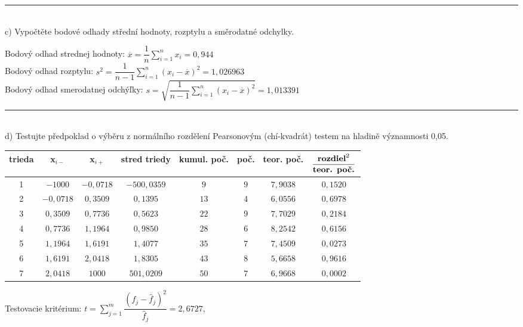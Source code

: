 \documentclass[pdftex, 11pt, a4paper, titlepage]{article}
\begin{document}
    \noindent\rule{\linewidth}{0.4pt}\\

    \noindent
    c) Vypočtěte bodové odhady střední hodnoty, rozptylu a směrodatné odchylky.

    \noindent
    Bodový odhad strednej hodnoty: $ \overline{x} = \dfrac{1}{n} \sum\limits_{i=1}^{n} x_i = 0,944 $ \\
    \noindent
    Bodový odhad rozptylu: $ s^2 = \dfrac{1}{n-1} \sum\limits_{i=1}^{n} (x_i - \overline{x})^2 = 1,026963 $ \\
    \noindent
    Bodový odhad smerodatnej odchýľky: $ s = \sqrt{\dfrac{1}{n-1} \sum\limits_{i=1}^{n} (x_i - \overline{x})^2} = 1,013391 $ \\
    
    \noindent\rule{\linewidth}{0.4pt}\\

    \noindent
    d) Testujte předpoklad o výběru z normálního rozdělení Pearsonovým
    (chí-kvadrát) testem na hladině významnosti 0,05.\\

    \begin{tabular}[]{|c|c|c|c|c|c|c|c|}
        \hline
        \textbf{trieda} & \textbf{x$_{i-}$} & \textbf{x$_{i+}$} & \textbf{stred triedy} & \textbf{kumul. poč.} & \textbf{poč.} & \textbf{teor. poč.} & $\dfrac{\text{\textbf{rozdiel}}^2}{\text{\textbf{teor. poč.}}}$ \\
        \hline
        1   &   $-1000$     & $-0,0718$ & $-500,0359$   & $9$   & $9$ & $7,9038$ & $0,1520$ \\
        2   &   $-0,0718$   & $0,3509$  & $0,1395$      & $13$  & $4$ & $6,0556$ & $0,6978$ \\
        3   &   $0,3509$    & $0,7736$  & $0,5623$      & $22$  & $9$ & $7,7029$ & $0,2184$ \\
        4   &   $0,7736$    & $1,1964$  & $0,9850$      & $28$  & $6$ & $8,2542$ & $0,6156$ \\
        5   &   $1,1964$    & $1,6191$  & $1,4077$      & $35$  & $7$ & $7,4509$ & $0,0273$ \\
        6   &   $1,6191$    & $2,0418$  & $1,8305$      & $43$  & $8$ & $5,6658$ & $0,9616$ \\
        7   &   $2,0418$    & $1000$    & $501,0209$    & $50$  & $7$ & $6,9668$ & $0,0002$ \\
        \hline
    \end{tabular}

    \noindent
    Testovacie kritérium: $ t= \sum\limits_{j=1}^{m} \dfrac{(f_j - \hat{f}_j)^2}{\hat{f}_j} = 2,6727$,\\
\end{document}
